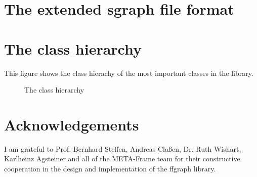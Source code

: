 \documentclass[a4paper]{article}
\newcommand{\meta}{{\sf META-Frame}}
\begin{document}
\begin{appendix}


% 

\section{The extended sgraph file format}
\label{sgraph_file_format}



\section{The class hierarchy}
\label{the_class_hierachy}

This figure shows the class hierachy of the most important
classes in the library.

\begin{figure}[htb]
\caption{The class hierarchy}
\end{figure}

\clearpage
\newpage

\section*{Acknowledgements}

I am grateful to Prof. Bernhard Steffen, Andreas Cla\ss en, Dr. Ruth
Wishart, Karlheinz Agsteiner and all of the \meta{} team for their
constructive cooperation in the design and implementation of the ffgraph
library.

\newpage 




\end{appendix}

\newpage


\end{document}

